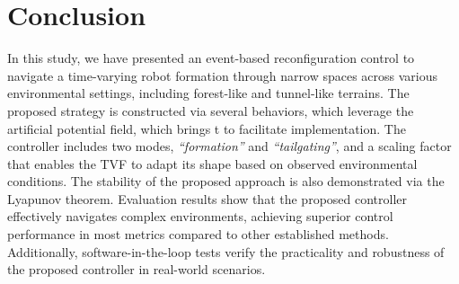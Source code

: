 \section{Conclusion}\label{sec5}
In this study, we have presented an event-based reconfiguration control to navigate a time-varying robot formation through narrow spaces across various environmental settings, including forest-like and tunnel-like terrains. The proposed strategy is constructed via several behaviors, which leverage the artificial potential field, which brings t to facilitate implementation. The controller includes two modes, \textit{``formation''} and \textit{``tailgating''}, and a scaling factor that enables the TVF to adapt its shape based on observed environmental conditions. The stability of the proposed approach is also demonstrated via the Lyapunov theorem. Evaluation results show that the proposed controller effectively navigates complex environments, achieving superior control performance in most metrics compared to other established methods. Additionally, software-in-the-loop tests verify the practicality and robustness of the proposed controller in real-world scenarios.